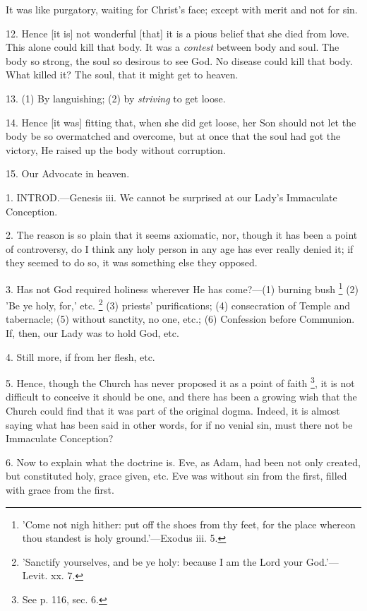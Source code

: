 It was like purgatory, waiting for Christ's face;
except with merit and not for sin.

12. Hence [it is] not wonderful [that] it is a
pious belief that she died from love. This alone could kill that body.
It was a \emph{contest} between body and soul. The body so strong, the
soul so desirous to see God. No disease could kill that body. What
killed it? The soul, that it might get to heaven.

13. (1) By languishing; (2) by \emph{striving} to
get loose.

14. Hence [it was] fitting that, when she did get
loose, her Son should not let the body be so overmatched and overcome,
but at once that the soul had got the victory, He raised up the body
without corruption.

15. Our Advocate in heaven.


1. INTROD.—Genesis
iii. We cannot be surprised at our Lady's Immaculate Conception.

2. The reason is so plain that it seems
axiomatic, nor, though it has been a point of controversy, do I think
any holy person in any age has ever really denied it; if they seemed
to do so, it was something else they opposed.

3. Has not God required holiness wherever He has
come?—(1) burning bush \footnote{'Come not nigh hither:
put off the shoes from thy feet, for the place whereon thou standest
is holy ground.'—Exodus iii. 5.}
(2) 'Be ye holy, for,' etc. \footnote{'Sanctify yourselves,
and be ye holy: because I am the Lord your God.'—Levit. xx. 7.}
(3) priests' purifications; (4) consecration of Temple and tabernacle;
(5) without sanctity, no one, etc.; (6) Confession before Communion.
If, then, our Lady was to hold God, etc.

4. Still more, if from her flesh, etc.

5. Hence, though the Church has never proposed it
as a point of faith \footnote{See p. 116, sec. 6.},
it is not difficult to conceive it should be one, and there has been a
growing wish that the Church could find that it was part of the
original dogma. Indeed, it is almost saying what has been said in
other words, for if no venial sin, must there not be Immaculate
Conception?

6. Now to explain what the doctrine is. Eve, as
Adam, had been not only created, but constituted holy, grace
given, etc. Eve was without sin from the first, filled with grace from
the first.

